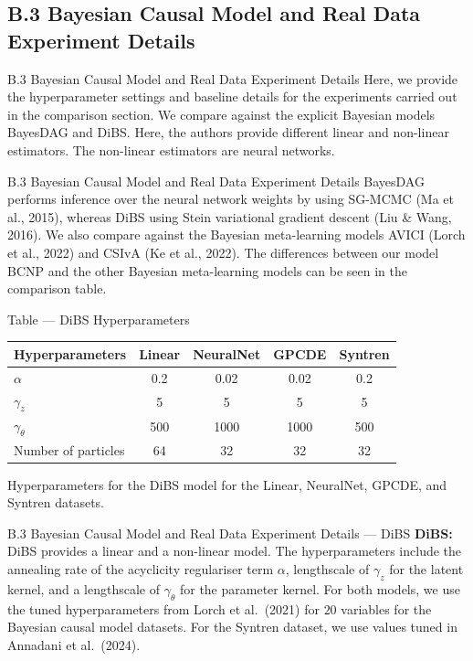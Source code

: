 \documentclass[aspectratio=169,10pt]{beamer}
\begin{document}
\subsection{B.3 Bayesian Causal Model and Real Data Experiment Details}

\begin{frame}{B.3 Bayesian Causal Model and Real Data Experiment Details}
\small
Here, we provide the hyperparameter settings and baseline details for the experiments carried out in the comparison section. We compare against the explicit Bayesian models BayesDAG and DiBS. Here, the authors provide different linear and non-linear estimators. The non-linear estimators are neural networks.
\end{frame}

\begin{frame}{B.3 Bayesian Causal Model and Real Data Experiment Details}
\small
BayesDAG performs inference over the neural network weights by using SG-MCMC (Ma et al., 2015), whereas DiBS using Stein variational gradient descent (Liu \& Wang, 2016). We also compare against the Bayesian meta-learning models AVICI (Lorch et al., 2022) and CSIvA (Ke et al., 2022). The differences between our model BCNP and the other Bayesian meta-learning models can be seen in the comparison table.
\end{frame}

\begin{frame}{Table --- DiBS Hyperparameters}
\centering
\begin{tabular}{lcccc}
\toprule
\textbf{Hyperparameters} & \textbf{Linear} & \textbf{NeuralNet} & \textbf{GPCDE}  & \textbf{Syntren}\\
\midrule
$\alpha$  & 0.2 & 0.02 & 0.02 & 0.2 \\
$\gamma_z$    & 5   & 5   & 5 & 5 \\
$\gamma_{\theta}$    & 500 & 1000 & 1000 & 500 \\
Number of particles & 64   &  32 & 32 & 32 \\
\bottomrule
\end{tabular}

\vspace{0.3cm}
{\footnotesize Hyperparameters for the DiBS model for the Linear, NeuralNet, GPCDE, and Syntren datasets.}
\end{frame}

\begin{frame}{B.3 Bayesian Causal Model and Real Data Experiment Details --- DiBS}
\small
\textbf{DiBS:}\quad
DiBS provides a linear and a non-linear model. The hyperparameters include the annealing rate of the acyclicity regulariser term $\alpha$, lengthscale of $\gamma_z$ for the latent kernel, and a lengthscale of $\gamma_{\theta}$ for the parameter kernel. For both models, we use the tuned hyperparameters from Lorch et al.\ (2021) for $20$ variables for the Bayesian causal model datasets. For the Syntren dataset, we use values tuned in Annadani et al.\ (2024).
\end{frame}
\end{document}
